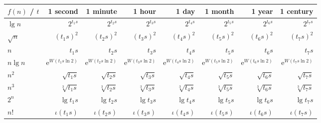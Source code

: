 \documentclass[12pt]{article}
\newcommand{\euler}{\mathrm{e}}
\begin{document}
\begin{table}[htbp]
  \renewcommand{\arraystretch}{1.2}
  \setlength{\tabcolsep}{7pt}
  \centering
  \begin{tabular}{l*{7}{r}}
    \toprule
    $f(n)$ / $t$ & 1 second & 1 minute & 1 hour & 1 day & 1 month & 1 year & 1 century \\ \midrule
    $\lg n$ & $2^{t_{1} s}$ & $2^{t_{2} s}$ & $2^{t_{3} s}$ & $2^{t_{4} s}$ & $2^{t_{5} s}$ & $2^{t_{6} s}$ & $2^{t_{7} s}$ \\
    $\sqrt{n}$ & $(t_{1} s)^{2}$ & $(t_{2} s)^{2}$ & $(t_{3} s)^{2}$ & $(t_{4} s)^{2}$ & $(t_{5} s)^{2}$ & $(t_{6} s)^{2}$ & $(t_{7} s)^{2}$ \\
    $n$ & $t_{1} s$ & $t_{2} s$ & $t_{3} s$ & $t_{4} s$ & $t_{5} s$ & $t_{6} s$ & $t_{7} s$ \\
    $n \lg n$ & $\euler^{W(t_{1} s \ln 2)}$ & $\euler^{W(t_{2} s \ln 2)}$ & $\euler^{W(t_{3} s \ln 2)}$ & $\euler^{W(t_{4} s \ln 2)}$ & $\euler^{W(t_{5} s \ln 2)}$ & $\euler^{W(t_{6} s \ln 2)}$ & $\euler^{W(t_{7} s \ln 2)}$ \\
    $n^{2}$ & $\sqrt{t_{1} s}$ & $\sqrt{t_{2} s}$ & $\sqrt{t_{3} s}$ & $\sqrt{t_{4} s}$ & $\sqrt{t_{5} s}$ & $\sqrt{t_{6} s}$ & $\sqrt{t_{7} s}$ \\
    $n^{3}$ & $\sqrt[3]{t_{1} s}$ & $\sqrt[3]{t_{2} s}$ & $\sqrt[3]{t_{3} s}$ & $\sqrt[3]{t_{4} s}$ & $\sqrt[3]{t_{5} s}$ & $\sqrt[3]{t_{6} s}$ & $\sqrt[3]{t_{7} s}$ \\
    $2^{n}$ & $\lg t_{1} s $ & $\lg t_{2} s $ & $\lg t_{3} s $ & $\lg t_{4} s $ & $\lg t_{5} s $ & $\lg t_{6} s $ & $\lg t_{7} s $ \\
    $n!$ & $\iota(t_{1} s)$ & $\iota(t_{2} s)$ & $\iota(t_{3} s)$ & $\iota(t_{4} s)$ & $\iota(t_{5} s)$ & $\iota(t_{6} s)$ & $\iota(t_{7} s)$ \\
    \bottomrule
  \end{tabular}
\end{table}


{\footnotesize
}
\end{document}
